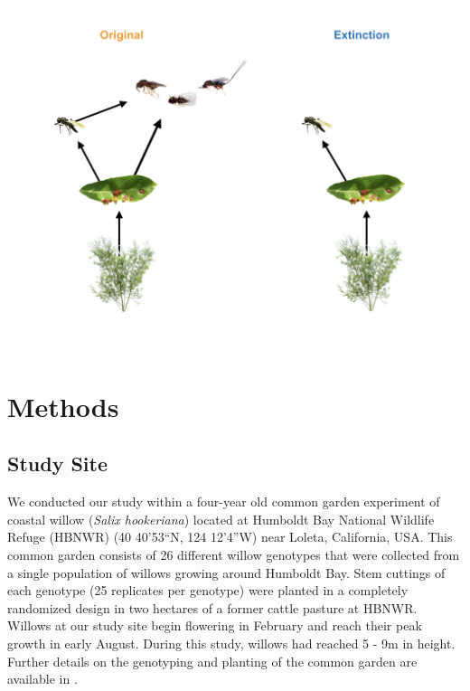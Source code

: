 \documentclass[11pt,]{article}
\let\origfigure\figure
\let\endorigfigure\endfigure
\renewenvironment{figure}[1][2] {
    \expandafter\origfigure\expandafter[H]
} {
    \endorigfigure
}
\begin{document}
\begin{figure}
\centering
\includegraphics{../analyses/complex_simple_foodwebs_v3.jpeg}
\caption{\label{fig:Conceptual}Experimental manipulation of food-web
structure associated with a leaf-galling midge (\emph{Iteomyia
salicisverruca}) feeding on the willow \emph{Salix hookeriana}. Black
arrows denote the flow of energy in this network of trophic
interactions. In the original food web, we allowed the full suite of egg
and larval parasitoids to impose selection. To simulate consumer
extinction, we used mesh bags to exclude the guild of larval
parasitoids, only allowing the egg parasitoid (\emph{Platygaster} sp.)
to impose selection. Larval parasitoids include the following species
(from left to right): \emph{Mesopolobus} sp. (Family: Pteromalidae);
\emph{Tetrastichus} sp. (Family: Eulophidae); and \emph{Torymus} sp.
(Family: Torymidae).}
\end{figure}

\section{Methods}\label{methods}

\subsection{Study Site}\label{study-site}

We conducted our study within a four-year old common garden experiment
of coastal willow (\emph{Salix hookeriana}) located at Humboldt Bay
National Wildlife Refuge (HBNWR) (40 40'53``N, 124 12'4''W) near Loleta,
California, USA. This common garden consists of 26 different willow
genotypes that were collected from a single population of willows
growing around Humboldt Bay. Stem cuttings of each genotype (25
replicates per genotype) were planted in a completely randomized design
in two hectares of a former cattle pasture at HBNWR. Willows at our
study site begin flowering in February and reach their peak growth in
early August. During this study, willows had reached 5 - 9m in height.
Further details on the genotyping and planting of the common garden are
available in \citet{Barbour2015}.
\end{document}
